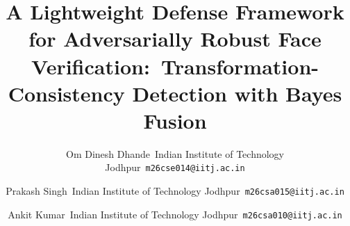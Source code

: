 \documentclass[10pt,twocolumn,letterpaper]{article}
\title{A Lightweight Defense Framework for Adversarially Robust Face Verification:\
Transformation-Consistency Detection with Bayes Fusion}
\author{Om Dinesh Dhande\
Indian Institute of Technology Jodhpur\
{\tt\small m26cse014@iitj.ac.in}
\and
Prakash Singh\
Indian Institute of Technology Jodhpur\
{\tt\small m26csa015@iitj.ac.in}
\and
Ankit Kumar\
Indian Institute of Technology Jodhpur\
{\tt\small m26csa010@iitj.ac.in}
}
\begin{document}
\maketitle








{
    \small
    
    
}
\end{document}
